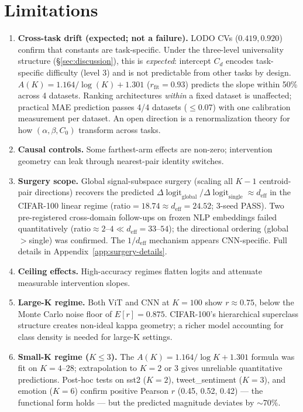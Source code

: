 \documentclass{article}
\DeclareMathOperator{\logit}{logit}
\begin{document}
\section{Limitations}
\label{sec:limitations}
\begin{enumerate}
\item \textbf{Cross-task drift (expected; not a failure).} LODO CVs ($0.419, 0.920$) confirm that constants are task-specific. Under the three-level universality structure (\S\ref{sec:discussion}), this is \emph{expected}: intercept $C_d$ encodes task-specific difficulty (level 3) and is not predictable from other tasks by design. $A(K) = 1.164/\log(K) + 1.301$ ($r_\mathrm{fit}=0.93$) predicts the slope within 50\% across 4 datasets. Ranking architectures \emph{within} a fixed dataset is unaffected; practical MAE prediction passes 4/4 datasets ($\leq$0.07) with one calibration measurement per dataset. An open direction is a renormalization theory for how $(\alpha,\beta,C_0)$ transform across tasks.
\item \textbf{Causal controls.} Some farthest-arm effects are non-zero; intervention geometry can leak through nearest-pair identity switches.
\item \textbf{Surgery scope.} Global signal-subspace surgery (scaling all $K-1$ centroid-pair directions) recovers the predicted $\Delta\logit_{\mathrm{global}}/\Delta\logit_{\mathrm{single}}\approx d_{\mathrm{eff}}$ in the CIFAR-100 linear regime (ratio$=18.74\approx d_{\mathrm{eff}}=24.52$; 3-seed PASS). Two pre-registered cross-domain follow-ups on frozen NLP embeddings failed quantitatively (ratio$\approx2$--$4\ll d_{\mathrm{eff}}=33$--$54$); the directional ordering (global$>$single) was confirmed. The $1/d_{\mathrm{eff}}$ mechanism appears CNN-specific. Full details in Appendix~\ref{app:surgery-details}.
\item \textbf{Ceiling effects.} High-accuracy regimes flatten logits and attenuate measurable intervention slopes.
\item \textbf{Large-K regime.} Both ViT and CNN at $K=100$ show $r\approx0.75$, below the Monte Carlo noise floor of $E[r]=0.875$. CIFAR-100's hierarchical superclass structure creates non-ideal kappa geometry; a richer model accounting for class density is needed for large-K settings.
\item \textbf{Small-K regime ($K\leq3$).} The $A(K)=1.164/\log K+1.301$ formula was fit on $K=4$--$28$; extrapolation to $K=2$ or $3$ gives unreliable quantitative predictions. Post-hoc tests on sst2 ($K=2$), tweet\_sentiment ($K=3$), and emotion ($K=6$) confirm positive Pearson $r$ (0.45, 0.52, 0.42) --- the functional form holds --- but the predicted magnitude deviates by $\sim70\%$.

\end{enumerate}
\end{document}
